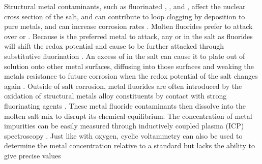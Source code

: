 Structural metal contaminants, such as fluorinated , , and
, affect the nuclear cross section of the salt, and can contribute to
loop clogging by deposition to pure metals, and can increase corrosion rates
\cite{rev10,rev29}. Molten fluorides prefer to attack  over
 or  \cite{rev23,rev33,rev34,rev35,rev36,rev37}.
Because  is the preferred metal to attack, any  or  in the
salt as fluorides will shift the redox potential and cause  to be
further attacked through substitutive fluorination \cite{rev29}. An excess of
 in the salt can cause it to plate out of solution onto other
metal surfaces, diffusing into those surfaces and weaking the metals resistance
to future corrosion when the redox potential of the salt changes again
\cite{rev29}. Outside of salt corrosion, metal fluorides are often introduced
by the oxidation of structural metals alloy constituents by contact with
strong fluorinating agents \cite{rev21,rev29,rev38}. These
metal fluoride contaminants then dissolve into the molten salt mix to disrupt
its chemical equilibrium. The concentration of metal impurities can be easily
measured through inductively coupled plasma (ICP) spectroscopy \cite{rev26}.
Just like with oxygen, cyclic voltammetry can also be used to determine the
metal concentration relative to a standard but lacks the ability to give
precise values \cite{rev27,rev39} \par
